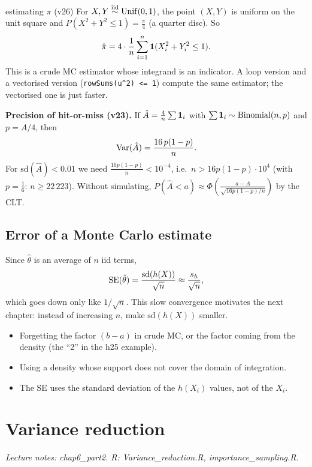 \begin{example}{estimating $\pi$ (v26)}
For $X,Y\overset{\text{iid}}{\sim}\mathrm{Unif}(0,1)$, the point $(X,Y)$ is uniform on the unit square and $P(X^2+Y^2\le1) = \frac\pi4$ (a quarter disc). So
\[
\hat\pi = 4\cdot\frac1n\sum_{i=1}^n\mathbf{1}(X_i^2+Y_i^2\le1).
\]
This is a crude MC estimator whose integrand is an indicator. A loop version and a vectorised version (\texttt{rowSums(u\^{}2) <= 1}) compute the same estimator; the vectorised one is just faster.
\end{example}

\textbf{Precision of hit-or-miss (v23).} If $\hat A = \frac{4}{n}\sum\mathbf{1}_i$ with $\sum\mathbf{1}_i\sim\mathrm{Binomial}(n,p)$ and $p = A/4$, then
\[
\mathrm{Var}(\hat A) = \frac{16\,p(1-p)}{n}.
\]
For $\mathrm{sd}(\hat A)<0.01$ we need $\frac{16p(1-p)}{n}<10^{-4}$, i.e.\ $n>16p(1-p)\cdot10^4$ (with $p=\frac16$: $n\ge22\,223$). Without simulating, $P(\hat A<a)\approx\Phi\left(\frac{a-A}{\sqrt{16p(1-p)/n}}\right)$ by the CLT.

\subsection{Error of a Monte Carlo estimate}
Since $\hat\theta$ is an average of $n$ iid terms,
\[
\mathrm{SE}(\hat\theta) = \frac{\mathrm{sd}(h(X))}{\sqrt n}\approx\frac{s_h}{\sqrt n},
\]
which goes down only like $1/\sqrt n$. This slow convergence motivates the next chapter: instead of increasing $n$, make $\mathrm{sd}(h(X))$ smaller.

\begin{traps}
\begin{itemize}
  \item Forgetting the factor $(b-a)$ in crude MC, or the factor coming from the density (the ``2'' in the h25 example).
  \item Using a density whose support does not cover the domain of integration.
  \item The SE uses the standard deviation of the $h(X_i)$ values, not of the $X_i$.
\end{itemize}
\end{traps}

\section{Variance reduction}
\textit{Lecture notes: chap6\_part2. R: Variance\_reduction.R, importance\_sampling.R.}

